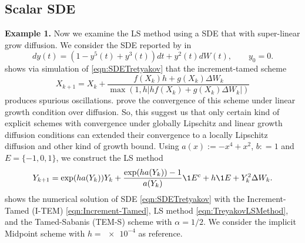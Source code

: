 \documentclass[sort&compress, preprint]{elsarticle}
\theoremstyle{definition}
\theoremstyle{plain}%
\theoremstyle{remark}
\newcommand{\SM}{LS\xspace}
\begin{document}
\subsection{Scalar SDE}	
	
{\textbf{Example 1.}} Now we examine the \SM method using a SDE that with super-linear grow diffusion. We 
	consider the SDE reported by \citeauthor*{Tretyakov2013} in \cite[Eq. (5.6)]{Tretyakov2013}
	\begin{equation}\label{eqn:SDETretyakov}
		dy(t) =
		\left(
			1-y^5(t) +y^3(t)  
		\right) dt
		+
		y^2(t) dW(t), \qquad y_0=0.
	\end{equation}
	\citeauthor{Tretyakov2013} shows via simulation of \eqref{eqn:SDETretyakov} that the increment-tamed scheme
	\cite[Eq(1.5)]{Hutzenthaler2015}
	\begin{equation}\label{eqn:Increment-Tamed}
		X_{k+1} = X_k + 
			\frac{
				f(X_k) h + 
				g(X_k)\Delta W_k 
			}{
			\max\left(
				1, h
				\left|
					h f(X_k) +
					g(X_k)\Delta W_k
				\right|
			\right)}
	\end{equation}
	produces spurious oscillations. \citeauthor{Hutzenthaler2015} prove the convergence of this scheme under
	linear growth condition over diffusion. So, this suggest us that only certain kind of 
	explicit schemes with convergence under globally Lipschitz and linear growth diffusion conditions	
	can extended their convergence to a locally Lipschitz diffusion and other kind of growth bound.
	Using $a(x):= -x^4 +x^2$, $b: = 1$ and $E=\{-1,0,1\}$, we construct the \SM method
	\begin{equation}\label{eqn:TreyakovLSMethod}
		Y_{k+1} = \exp(ha(Y_k))Y_k + 
		\frac{\exp(ha(Y_k)) - 1}{a(Y_k)} \1{E^c}
		+h\1{E}
		+Y_k^2\Delta W_k. 		
	\end{equation}
	 shows the numerical solution of SDE \eqref{eqn:SDETretyakov} with the Increment-Tamed (I-TEM) 
	\eqref{eqn:Increment-Tamed}, \SM method \eqref{eqn:TreyakovLSMethod}, and the Tamed-Sabanis (TEM-S) scheme with 
	$\alpha=1/2$. 
	We consider the implicit Midpoint scheme \cite[Eq.(5.3)]{Tretyakov2013} with $h=\num{e-4}$ 
	as reference.
\end{document}
